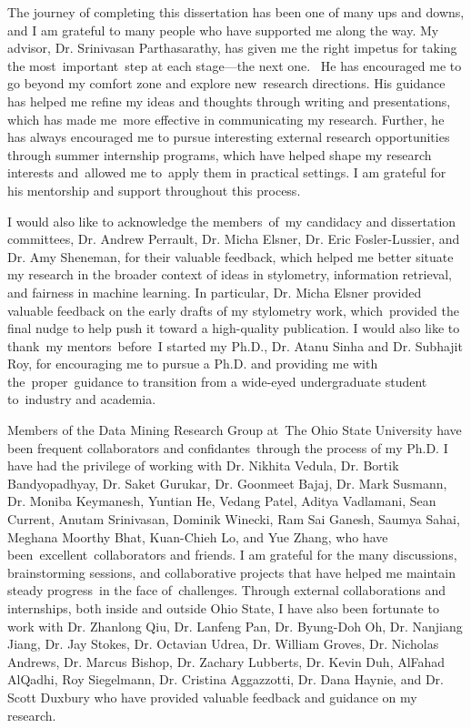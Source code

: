 
The journey of completing this dissertation has been one of many ups and downs, and I am grateful to many people who have supported me along the way.
My advisor, Dr. Srinivasan Parthasarathy, has given me the right impetus for taking the most important step at each stage—the next one. 
He has encouraged me to go beyond my comfort zone and explore new research directions.
His guidance has helped me refine my ideas and thoughts through writing and presentations, which has made me more effective in communicating my research.
Further, he has always encouraged me to pursue interesting external research opportunities through summer internship programs, which have helped shape my research interests and allowed me to apply them in practical settings.
I am grateful for his mentorship and support throughout this process.

I would also like to acknowledge the members of my candidacy and dissertation committees, Dr. Andrew Perrault, Dr. Micha Elsner, Dr. Eric Fosler-Lussier, and Dr. Amy Sheneman, for their valuable feedback, which helped me better situate my research in the broader context of ideas in stylometry, information retrieval, and fairness in machine learning.
In particular, Dr. Micha Elsner provided valuable feedback on the early drafts of my stylometry work, which provided the final nudge to help push it toward a high-quality publication.
I would also like to thank my mentors before I started my Ph.D., Dr. Atanu Sinha and Dr. Subhajit Roy, for encouraging me to pursue a Ph.D. and providing me with the proper guidance to transition from a wide-eyed undergraduate student to industry and academia.

Members of the Data Mining Research Group at The Ohio State University have been frequent collaborators and confidantes through the process of my Ph.D.
I have had the privilege of working with Dr. Nikhita Vedula, Dr. Bortik Bandyopadhyay, Dr. Saket Gurukar, Dr. Goonmeet Bajaj, Dr. Mark Susmann, Dr. Moniba Keymanesh, Yuntian He, Vedang Patel, Aditya Vadlamani, Sean Current, Anutam Srinivasan, Dominik Winecki, Ram Sai Ganesh, Saumya Sahai, Meghana Moorthy Bhat, Kuan-Chieh Lo, and Yue Zhang, who have been excellent collaborators and friends.
I am grateful for the many discussions, brainstorming sessions, and collaborative projects that have helped me maintain steady progress in the face of challenges.
Through external collaborations and internships, both inside and outside Ohio State, I have also been fortunate to work with Dr. Zhanlong Qiu, Dr. Lanfeng Pan, Dr. Byung-Doh Oh, Dr. Nanjiang Jiang, Dr. Jay Stokes, Dr. Octavian Udrea, Dr. William Groves, Dr. Nicholas Andrews, Dr. Marcus Bishop, Dr. Zachary Lubberts, Dr. Kevin Duh, AlFahad AlQadhi, Roy Siegelmann, Dr. Cristina Aggazzotti, Dr. Dana Haynie, and Dr. Scott Duxbury who have provided valuable feedback and guidance on my research.

